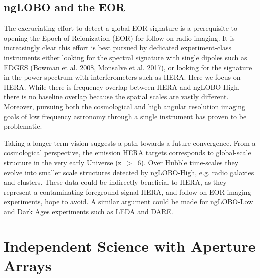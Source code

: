 \documentclass[11pt]{article}
\begin{document}
\subsection{ngLOBO and the EOR}

The excruciating effort to detect a global EOR signature is a prerequisite to opening the Epoch of Reionization (EOR) for follow-on radio imaging. It is increasingly clear this effort is best pursued by dedicated experiment-class instruments either looking for the spectral signature with single dipoles such as EDGES (Bowman et al. 2008, Monsalve et al. 2017), or looking for the signature in the power spectrum with interferometers such as HERA. Here we focus on HERA. While there is frequency overlap between HERA and ngLOBO-High, there is no baseline overlap because the spatial scales are vastly different. Moreover, pursuing both the cosmological and high angular resolution imaging goals of low frequency astronomy through a single instrument has proven to be problematic. 

Taking a longer term vision suggests a path towards a future convergence. From a cosmological perspective, the emission HERA targets corresponds to global-scale structure in the very early Universe (z~$>$~6). Over Hubble time-scales they evolve into smaller scale structures detected by ngLOBO-High, e.g. radio galaxies and clusters. These data could be indirectly beneficial to HERA, as they represent a contaminating foreground signal HERA, and follow-on EOR imaging experiments, hope to avoid. A similar argument could be made for ngLOBO-Low and Dark Ages experiments such as LEDA and DARE.


\vspace{-0.5cm}
\section{Independent Science with Aperture Arrays}
\vspace{-0.25cm}
\end{document}
